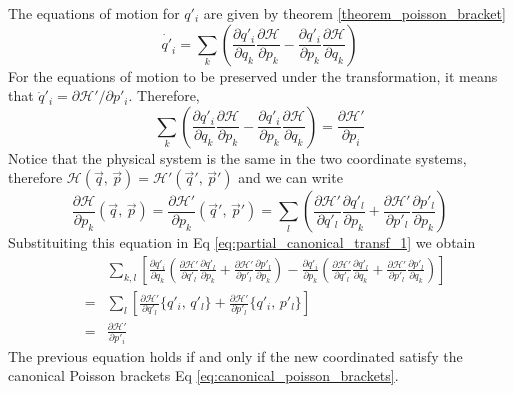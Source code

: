\documentclass[11pt,fleqn]{book} %
\begin{document}
The equations of motion for $q'_i$ are given by theorem \ref{theorem_poisson_bracket}
\begin{equation*}
    \dot{q'}_i = \sum_k\left(\frac{\partial q'_i}{\partial q_k}\frac{\partial\mathcal{H}}{\partial p_k}
    - \frac{\partial q'_i}{\partial p_k}\frac{\partial\mathcal{H}}{\partial q_k} \right)
\end{equation*}
For the equations of motion to be preserved under the transformation, it means that $\dot{q}'_i = \partial\mathcal{H'}/\partial p'_i$. 
Therefore,
\begin{equation}
    \label{eq:partial_canonical_transf_1}
    \sum_k\left(\frac{\partial q'_i}{\partial q_k}\frac{\partial\mathcal{H}}{\partial p_k}
    - \frac{\partial q'_i}{\partial p_k}\frac{\partial\mathcal{H}}{\partial q_k} \right) = 
    \frac{\partial\mathcal{H'}}{\partial p_i}
\end{equation}
Notice that the physical system is the same in the two coordinate systems, therefore $\mathcal{H}(\vec q,\,\vec p) = \mathcal{H}'(\vec q',\,\vec p')$ and we 
can write
\begin{equation*}
    \frac{\partial\mathcal{H}}{\partial p_k}(\vec q,\,\vec p) = \frac{\partial\mathcal{H'}}{\partial p_k}(\vec q',\,\vec p') =
    \sum_l\left(\frac{\partial\mathcal{H'}}{\partial q'_l}\frac{\partial q'_l}{\partial p_k} + \frac{\partial\mathcal{H'}}{\partial p'_l}\frac{\partial p'_l}{\partial p_k} \right)
\end{equation*}
Substituiting this equation in Eq \ref{eq:partial_canonical_transf_1} we obtain
\begin{eqnarray*}
    &&\sum_{k,l}\left[ 
        \frac{\partial q'_i}{\partial q_k}\left(
            \frac{\partial\mathcal{H'}}{\partial q'_l}\frac{\partial q'_l}{\partial p_k} + \frac{\partial\mathcal{H'}}{\partial p'_l}\frac{\partial p'_l}{\partial p_k}
        \right)
        - \frac{\partial q'_i}{\partial p_k}\left(
            \frac{\partial\mathcal{H'}}{\partial q'_l}\frac{\partial q'_l}{\partial q_k} + \frac{\partial\mathcal{H'}}{\partial p'_l}\frac{\partial p'_l}{\partial q_k}
        \right)
    \right] \\
    &=& \sum_l\left[\frac{\partial\mathcal{H'}}{\partial q'_l}\{q'_i,\,q'_l\} + \frac{\partial\mathcal{H'}}{\partial p'_l}\{q'_i,\,p'_l\}\right] \\
    &=& \frac{\partial\mathcal{H'}}{\partial p'_i}
\end{eqnarray*}
The previous equation holds if and only if the new coordinated satisfy the canonical Poisson brackets Eq \ref{eq:canonical_poisson_brackets}.
\end{document}
